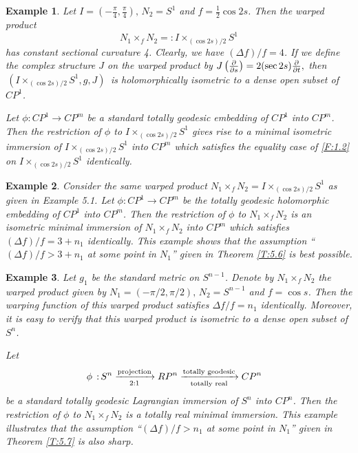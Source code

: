 \documentclass{amsart}
\theoremstyle{plain}
\newtheorem{example}{Example}[section]
\numberwithin{equation}{section}
\theoremstyle{remark}
\numberwithin{equation}{section}
\begin{document}
\begin{example} {\rm Let $I=(-\frac{\pi}{4},\frac{\pi}{4}),\, N_2=S^1$ and $f=\frac{1}{2}\cos 2 s$. Then the warped product
$$N_1\times_f N_2=: I\times_{(\cos 2 s)/2}S^1 $$ has constant sectional curvature 4. Clearly, we have $(\Delta f)/f=4$. If we define the complex structure $J$ on the warped product by
$J\left({\partial\over {\partial s}}\right)=2(\sec 2 s) {\partial\over {\partial t}},$
 then $\,(I\times_{(\cos 2 s)/2}S^1,g,J)\,$ is  holomorphically isometric to a dense open subset of $CP^1$.

Let $\phi:CP^1\to CP^m$ be a standard totally geodesic embedding of $CP^1$ into $CP^m$. Then the restriction of $\phi$ to $I\times_{(\cos 2 s)/2}S^1$ gives rise to a minimal isometric immersion of $I\times_{(\cos 2 s)/2}
S^1$ into $CP^m$ which  satisfies the equality case of \eqref{F:1.2} on $I\times_{(\cos 2 s)/2} S^1$  identically. }
\end{example}

\begin{example} {\rm Consider the same warped product $N_1\times_f N_2=I\times_{(\cos 2 s)/2}S^1$ as given in Example 5.1. Let $\phi:CP^1\to CP^m$ be the  totally geodesic holomorphic embedding of $CP^1$ into $CP^m$. Then the restriction of $\phi$ to $N_1\times_f N_2$ is an isometric minimal immersion of $N_1\times_f N_2$ into $CP^m$ which satisfies $(\Delta f)/f=3+n_1$ identically. 
This example shows that the assumption ``$(\Delta f)/f>3+n_1$ at some point in $N_1$'' given in Theorem \ref{T:5.6} is best possible.}\end{example}

\begin{example} {\rm Let  $g_1$ be the standard metric on $S^{n-1}$. Denote by $N_1\times_f N_2$ the warped product given by $N_1=(-\pi/2,\pi/2),\,N_2=S^{n-1}$ and $f=\cos s$. Then the warping function of this warped product satisfies $\Delta f/{f}=n_1$
identically. Moreover, it is easy to verify that this warped product is isometric to a dense open subset of $S^n$.

Let \begin{align}\phi\,:\, & S^n\xrightarrow[\text{2:1}]{\text{projection}}
RP^{n} \xrightarrow[\text{totally real}]{\text{totally geodesic}}  CP^n\notag\end{align}
be a standard totally geodesic Lagrangian immersion of $S^n$ into $CP^n$. Then the restriction of $\phi$ to $N_1\times_f N_2$ is a totally real minimal
immersion.
This example illustrates that the assumption ``$(\Delta f)/f>n_1$ at some point in $N_1$'' given in Theorem \ref{T:5.7} is also sharp.}\end{example}
\end{document}
